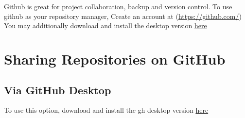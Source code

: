 \documentclass[
]{book}
\begin{document}
Github is great for project collaboration, backup and version control.
To use github as your repository manager, Create an account at (\url{https://github.com/})
You may additionally download and install the desktop version \href{https://desktop.github.com/}{here}

\hypertarget{sharing-repositories-on-github}{%
\section{Sharing Repositories on GitHub}\label{sharing-repositories-on-github}}

\hypertarget{via-github-desktop}{%
\subsection{Via GitHub Desktop}\label{via-github-desktop}}

To use this option, download and install the gh desktop version \href{https://desktop.github.com/}{here}
\end{document}
